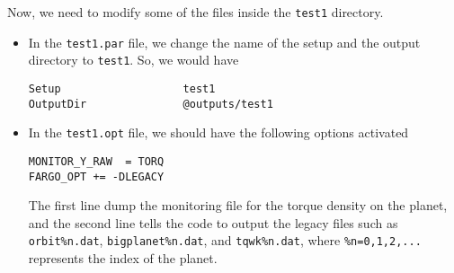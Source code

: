 \documentclass[14pt]{scrartcl}
\begin{document}
Now, we need to modify some of the files inside the \texttt{test1} directory.
\begin{itemize}
    \item In the \texttt{test1.par} file, we change the name of the setup and the output directory to \texttt{test1}. So, we would have 
    \begin{verbatim}
Setup                   test1
OutputDir               @outputs/test1
    \end{verbatim}
    \item In the \texttt{test1.opt} file, we should have the following options activated
    \begin{verbatim}
MONITOR_Y_RAW  = TORQ
FARGO_OPT += -DLEGACY
	\end{verbatim}
The first line dump the monitoring file for the torque density on the planet, and the second line tells the code to output the legacy files such as \texttt{orbit\%n.dat}, \texttt{bigplanet\%n.dat}, and \texttt{tqwk\%n.dat}, where \texttt{\%n=0,1,2,...} represents the index of the planet.
\end{itemize} 
\end{document}

